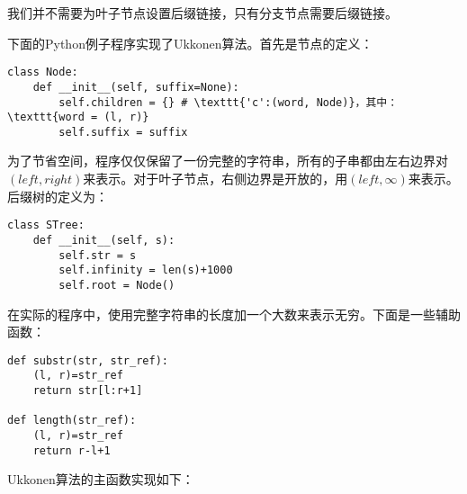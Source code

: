 \documentclass[UTF8]{article}
\begin{document}
我们并不需要为叶子节点设置后缀链接，只有分支节点需要后缀链接。

下面的Python例子程序实现了Ukkonen算法。首先是节点的定义：

\lstset{language=Python}
\begin{lstlisting}
class Node:
    def __init__(self, suffix=None):
        self.children = {} # \texttt{'c':(word, Node)}，其中：\texttt{word = (l, r)}
        self.suffix = suffix
\end{lstlisting}

为了节省空间，程序仅仅保留了一份完整的字符串，所有的子串都由左右边界对$(left, right)$来表示。对于叶子节点，右侧边界是开放的，用$(left, \infty)$来表示。后缀树的定义为：

\begin{lstlisting}
class STree:
    def __init__(self, s):
        self.str = s
        self.infinity = len(s)+1000
        self.root = Node()
\end{lstlisting}

在实际的程序中，使用完整字符串的长度加一个大数来表示无穷。下面是一些辅助函数：

\begin{lstlisting}
def substr(str, str_ref):
    (l, r)=str_ref
    return str[l:r+1]

def length(str_ref):
    (l, r)=str_ref
    return r-l+1
\end{lstlisting}

Ukkonen算法的主函数实现如下：
\end{document}
